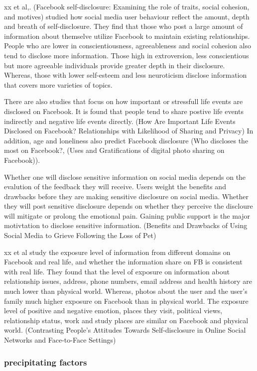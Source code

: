 xx et al,. (Facebook self-disclosure: Examining the role of traits, social cohesion, and motives) studied how social media user behaviour reflect the amount, depth and breath of self-disclosure. They find that those who post a large amount of information about themselve utilize Facebook to maintain existing relationships.
 People who are lower in conscientiousness, agreeableness and social cohesion also tend to disclose more information. Those high in extroversion, less conscientious but more agreeable individuals provide greater depth in their disclosure. Whereas, those with lower self-esteem and less neuroticism disclose information that covers more varieties of topics.


There are also studies that focus on how important or stressfull life events are disclosed on Facebook. It is found that people tend to share postive life events indirectly and negative life events directly.
(How Are Important Life Events Disclosed on Facebook? Relationships with Likelihood of Sharing and Privacy) In addition, age and loneliness also predict Facebook disclosure (Who discloses the most on Facebook?, (Uses and Gratifications of digital photo sharing on Facebook)).

Whether one will disclose sensitive information on social media depends on the evalution of the feedback they will receive. Users weight the benefits and drawbacks before they are making sensitive disclosure on social media. Whether they will post sensitive disclosure depends on whether they perceive the discloure will mitigate or prolong the emotional pain. Gaining public support is the major motivtation to disclose sensitive information. (Benefits and Drawbacks of Using Social Media to Grieve Following the Loss of Pet)


xx et al study the exposure level of information from different domains on Facebook and real life, and whether the information share on FB is consistent with real life. They found that the level of exposure on information about relationship issues, address, phone numbers, email address and health history are much lower than physical world. Whereas, photos about the user and the user's family much higher exposure on Facebook than in physical world. The exposure level of positive and negative emotion, places they visit, political views, relationship status, work and study places are similar on Facebook and physical world. (Contrasting People’s Attitudes Towards Self-disclosure in Online Social Networks and Face-to-Face Settings) 


\subsubsection{precipitating factors}


